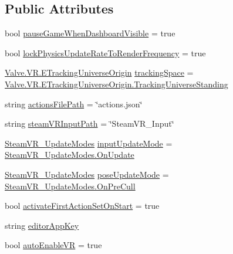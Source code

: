 \subsection*{Public Attributes}
\begin{DoxyCompactItemize}
\item 
bool \mbox{\hyperlink{class_valve_1_1_v_r_1_1_steam_v_r___settings_a514e6804f03bf72db516ee2e0cac8dec}{pause\+Game\+When\+Dashboard\+Visible}} = true
\item 
bool \mbox{\hyperlink{class_valve_1_1_v_r_1_1_steam_v_r___settings_ae16e224584b00f3f29df72eb6a05954a}{lock\+Physics\+Update\+Rate\+To\+Render\+Frequency}} = true
\item 
\mbox{\hyperlink{namespace_valve_1_1_v_r_a29be99a3c2f780157bd490db06a7f12f}{Valve.\+V\+R.\+E\+Tracking\+Universe\+Origin}} \mbox{\hyperlink{class_valve_1_1_v_r_1_1_steam_v_r___settings_a915da3507ad2861be45ad3d957cece37}{tracking\+Space}} = \mbox{\hyperlink{namespace_valve_1_1_v_r_a29be99a3c2f780157bd490db06a7f12fa1feb85821c36bd21cde62a6527646367}{Valve.\+V\+R.\+E\+Tracking\+Universe\+Origin.\+Tracking\+Universe\+Standing}}
\item 
string \mbox{\hyperlink{class_valve_1_1_v_r_1_1_steam_v_r___settings_a6baa46b6747cc8d10f2b3dc218d1b39b}{actions\+File\+Path}} = \char`\"{}actions.\+json\char`\"{}
\item 
string \mbox{\hyperlink{class_valve_1_1_v_r_1_1_steam_v_r___settings_af9de2fa06a57c1d393d55e654e2b77a4}{steam\+V\+R\+Input\+Path}} = \char`\"{}Steam\+V\+R\+\_\+\+Input\char`\"{}
\item 
\mbox{\hyperlink{namespace_valve_1_1_v_r_ac8b0fe3bc9754b0fb9f1351ae3444ac6}{Steam\+V\+R\+\_\+\+Update\+Modes}} \mbox{\hyperlink{class_valve_1_1_v_r_1_1_steam_v_r___settings_a17e66518dc96a28412dd2032ff9791f2}{input\+Update\+Mode}} = \mbox{\hyperlink{namespace_valve_1_1_v_r_ac8b0fe3bc9754b0fb9f1351ae3444ac6adad07967ee58700afec07a543d5a5e46}{Steam\+V\+R\+\_\+\+Update\+Modes.\+On\+Update}}
\item 
\mbox{\hyperlink{namespace_valve_1_1_v_r_ac8b0fe3bc9754b0fb9f1351ae3444ac6}{Steam\+V\+R\+\_\+\+Update\+Modes}} \mbox{\hyperlink{class_valve_1_1_v_r_1_1_steam_v_r___settings_a1acd0f56e18ac3796933e2da5b8f3ab0}{pose\+Update\+Mode}} = \mbox{\hyperlink{namespace_valve_1_1_v_r_ac8b0fe3bc9754b0fb9f1351ae3444ac6a0384dab65f333cc4dd5858f28513ee82}{Steam\+V\+R\+\_\+\+Update\+Modes.\+On\+Pre\+Cull}}
\item 
bool \mbox{\hyperlink{class_valve_1_1_v_r_1_1_steam_v_r___settings_a425721484883a02cc85696978b90d417}{activate\+First\+Action\+Set\+On\+Start}} = true
\item 
string \mbox{\hyperlink{class_valve_1_1_v_r_1_1_steam_v_r___settings_a02c2ede3ee1e2b43ff78ee669c8325a0}{editor\+App\+Key}}
\item 
bool \mbox{\hyperlink{class_valve_1_1_v_r_1_1_steam_v_r___settings_a8da7f0e648aac13f57fbc54ccc423a3a}{auto\+Enable\+VR}} = true
\end{DoxyCompactItemize}
